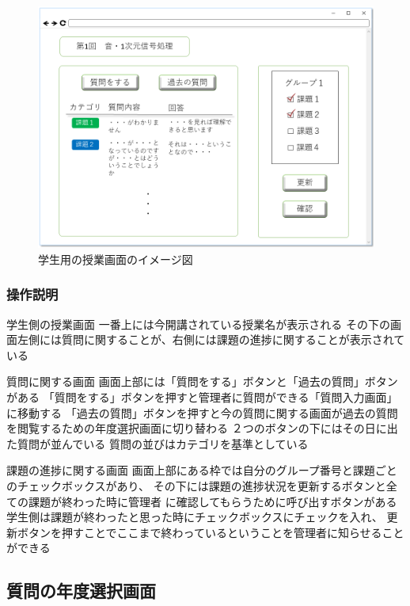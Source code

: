 \begin{figure}[htbp]
\begin{center}
  \includegraphics[width=1\linewidth,clip]{./img/sc_class_student.png}
  \caption{学生用の授業画面のイメージ図}\label{fig:sc_class_student}
\end{center}
\end{figure}

\subsubsection{操作説明}
学生側の授業画面
一番上には今開講されている授業名が表示される
その下の画面左側には質問に関することが、右側には課題の進捗に関することが表示されている

質問に関する画面
画面上部には「質問をする」ボタンと「過去の質問」ボタンがある
「質問をする」ボタンを押すと管理者に質問ができる「質問入力画面」に移動する
「過去の質問」ボタンを押すと今の質問に関する画面が過去の質問を閲覧するための年度選択画面に切り替わる
２つのボタンの下にはその日に出た質問が並んでいる
質問の並びはカテゴリを基準としている

課題の進捗に関する画面
画面上部にある枠では自分のグループ番号と課題ごとのチェックボックスがあり、
その下には課題の進捗状況を更新するボタンと全ての課題が終わった時に管理者
に確認してもらうために呼び出すボタンがある
学生側は課題が終わったと思った時にチェックボックスにチェックを入れ、
更新ボタンを押すことでここまで終わっているということを管理者に知らせることができる

\subsection{質問の年度選択画面}
